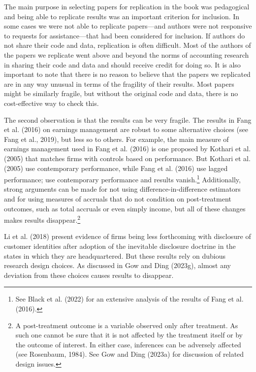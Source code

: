 \documentclass[
  letterpaper,
  DIV=11,
  numbers=noendperiod]{scrartcl}
\begin{document}
The main purpose in selecting papers for replication in the book was
pedagogical and being able to replicate results was an important
criterion for inclusion. In some cases we were not able to replicate
papers---and authors were not responsive to requests for
assistance---that had been considered for inclusion. If authors do not
share their code and data, replication is often difficult. Most of the
authors of the papers we replicate went above and beyond the norms of
accounting research in sharing their code and data and should receive
credit for doing so. It is also important to note that there is no
reason to believe that the papers we replicated are in any way unusual
in terms of the fragility of their results. Most papers might be
similarly fragile, but without the original code and data, there is no
cost-effective way to check this.

The second observation is that the results can be very fragile. The
results in Fang et al. (2016) on earnings management are robust to some
alternative choices (see Fang et al., 2019), but less so to others. For
example, the main measure of earnings management used in Fang et al.
(2016) is one proposed by Kothari et al. (2005) that matches firms with
controls based on performance. But Kothari et al. (2005) use
contemporary performance, while Fang et al. (2016) use lagged
performance; use contemporary performance and results vanish.\footnote{See
  Black et al. (2022) for an extensive analysis of the results of Fang
  et al. (2016).} Additionally, strong arguments can be made for not
using difference-in-difference estimators and for using measures of
accruals that do not condition on post-treatment outcomes, such as total
accruals or even simply income, but all of these changes makes results
disappear.\footnote{A post-treatment outcome is a variable observed only
  after treatment. As such one cannot be sure that it is not affected by
  the treatment itself or by the outcome of interest. In either case,
  inferences can be adversely affected (see Rosenbaum, 1984). See Gow
  and Ding (2023a) for discussion of related design issues.}

Li et al. (2018) present evidence of firms being less forthcoming with
disclosure of customer identities after adoption of the inevitable
disclosure doctrine in the states in which they are headquartered. But
these results rely on dubious research design choices. As discussed in
Gow and Ding (2023g), almost any deviation from these choices causes
results to disappear.
\end{document}
